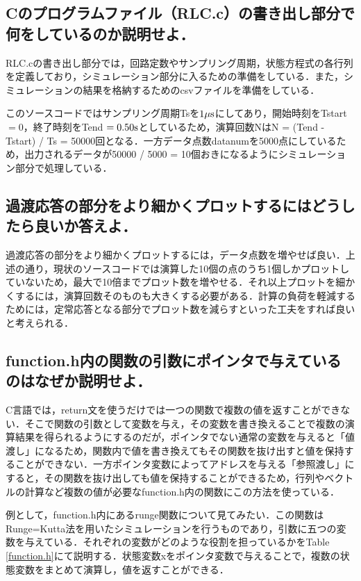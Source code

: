\documentclass[a4paper,10pt,twocolumn,fleqn]{jarticle}
\begin{document}
  \subsection{Cのプログラムファイル（RLC.c）の書き出し部分で何をしているのか説明せよ．}
    RLC.cの書き出し部分では，回路定数やサンプリング周期，状態方程式の各行列を定義しており，シミュレーション部分に入るための準備をしている．また，シミュレーションの結果を格納するためのcsvファイルを準備をしている．

    このソースコードではサンプリング周期Tsを$1{\rm \mu s}$にしてあり，開始時刻をTstart $ = 0$，終了時刻をTend $= 0.50{\rm s}$としているため，演算回数NはN = (Tend - Tstart) / Ts = 50000回となる．一方データ点数datanumを5000点にしているため，出力されるデータが50000 / 5000 = 10個おきになるようにシミュレーション部分で処理している．

  \subsection{過渡応答の部分をより細かくプロットするにはどうしたら良いか答えよ．}
    過渡応答の部分をより細かくプロットするには，データ点数を増やせば良い．上述の通り，現状のソースコードでは演算した10個の点のうち1個しかプロットしていないため，最大で10倍までプロット数を増やせる．それ以上プロットを細かくするには，演算回数そのものも大きくする必要がある．計算の負荷を軽減するためには，定常応答となる部分でプロット数を減らすといった工夫をすれば良いと考えられる．

  \subsection{function.h内の関数の引数にポインタで与えているのはなぜか説明せよ．}


  C言語では，return文を使うだけでは一つの関数で複数の値を返すことができない．そこで関数の引数として変数を与え，その変数を書き換えることで複数の演算結果を得られるようにするのだが，ポインタでない通常の変数を与えると「値渡し」になるため，関数内で値を書き換えてもその関数を抜け出すと値を保持することができない．一方ポインタ変数によってアドレスを与える「参照渡し」にすると，その関数を抜け出しても値を保持することができるため，行列やベクトルの計算など複数の値が必要なfunction.h内の関数にこの方法を使っている．

  例として，function.h内にあるrunge関数について見てみたい．この関数はRunge=Kutta法を用いたシミュレーションを行うものであり，引数に五つの変数を与えている．それぞれの変数がどのような役割を担っているかをTable \ref{function.h}にて説明する．状態変数xをポインタ変数で与えることで，複数の状態変数をまとめて演算し，値を返すことができる．
\end{document}
